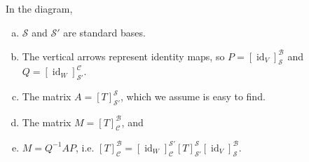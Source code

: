 In the diagram,
\begin{enumerate}[a)]
	\item $\mathcal{S}$ and $\mathcal{S}'$ are standard bases.
	\item The vertical arrows represent identity maps, so $P = [\operatorname{id}_V]_\mathcal{S}^\mathcal{B}$ and $Q = [\operatorname{id}_W]_{\mathcal{S}'}^\mathcal{C}$.
	\item The matrix $A = [T]_{\mathcal{S}'}^\mathcal{S}$, which we assume is easy to find.
	\item The matrix $M = [T]_\mathcal{C}^\mathcal{B}$, and
	\item $M = Q^{-1} A P$, i.e. $[T]_\mathcal{C}^\mathcal{B} = [\operatorname{id}_W]_\mathcal{C}^{\mathcal{S}'} [T]_{\mathcal{S}'}^\mathcal{S} [\operatorname{id}_V]_\mathcal{S}^\mathcal{B}$.
\end{enumerate}
